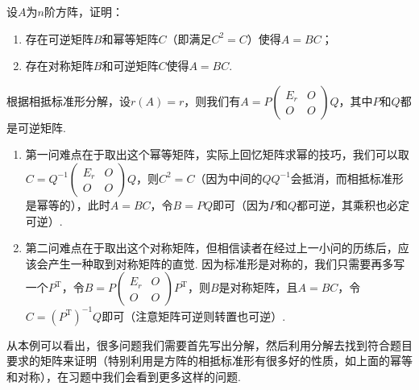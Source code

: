 \begin{example}{}{}
    设$A$为$n$阶方阵，证明：
    \begin{enumerate}
        \item 存在可逆矩阵$B$和幂等矩阵$C$（即满足$C^2=C$）使得$A=BC$；
        \item 存在对称矩阵$B$和可逆矩阵$C$使得$A=BC$.
    \end{enumerate}
\end{example}

\begin{solution}
    根据相抵标准形分解，设$r(A)=r$，则我们有$A=P\begin{pmatrix}
            E_r & O \\ O & O
        \end{pmatrix}Q$，其中$P$和$Q$都是可逆矩阵.
    \begin{enumerate}
        \item 第一问难点在于取出这个幂等矩阵，实际上回忆矩阵求幂的技巧，我们可以取$C=Q^{-1}\begin{pmatrix}
                      E_r & O \\ O & O
                  \end{pmatrix}Q$，则$C^2=C$（因为中间的$QQ^{-1}$会抵消，而相抵标准形是幂等的），此时$A=BC$，令$B=PQ$即可（因为$P$和$Q$都可逆，其乘积也必定可逆）.

        \item 第二问难点在于取出这个对称矩阵，但相信读者在经过上一小问的历练后，应该会产生一种取到对称矩阵的直觉. 因为标准形是对称的，我们只需要再多写一个$P^\mathrm{T}$，令$B=P\begin{pmatrix}
                      E_r & O \\ O & O
                  \end{pmatrix}P^\mathrm{T}$，则$B$是对称矩阵，且$A=BC$，令$C=(P^\mathrm{T})^{-1}Q$即可（注意矩阵可逆则转置也可逆）.
    \end{enumerate}
\end{solution}

从本例可以看出，很多问题我们需要首先写出分解，然后利用分解去找到符合题目要求的矩阵来证明（特别利用是方阵的相抵标准形有很多好的性质，如上面的幂等和对称），在习题中我们会看到更多这样的问题.

